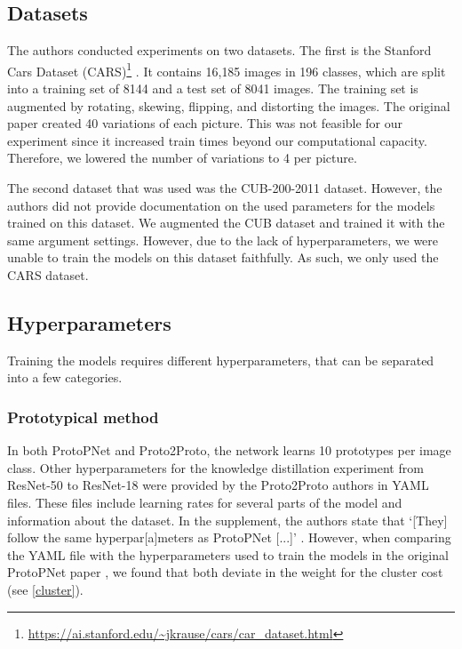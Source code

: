\subsection{Datasets}
The authors conducted experiments on two datasets. The first is the Stanford Cars Dataset (CARS)\footnote{\url{https://ai.stanford.edu/~jkrause/cars/car_dataset.html}} \cite{krause20133d}. It contains 16,185 images in 196 classes, which are split into a training set of 8144 and a test set of 8041 images. The training set is augmented by rotating, skewing, flipping, and distorting the images. The original paper created 40 variations of each picture. This was not feasible for our experiment since it increased train times beyond our computational capacity. Therefore, we lowered the number of variations to 4 per picture. \par 
The second dataset that was used was the CUB-200-2011 \cite{wah2011caltech} dataset. However, the authors did not provide documentation on the used parameters for the models trained on this dataset. We augmented the CUB dataset and trained it with the same argument settings. However, due to the lack of hyperparameters, we were unable to train the models on this dataset faithfully. As such, we only used the CARS dataset.


\subsection{Hyperparameters}
Training the models requires different hyperparameters, that can be separated into a few categories.

\subsubsection{Prototypical method}
In both ProtoPNet and Proto2Proto, the network learns 10 prototypes per image class. Other hyperparameters for the knowledge distillation experiment from ResNet-50 to ResNet-18 were provided by the Proto2Proto authors in YAML files. These files include learning rates for several parts of the model and information about the dataset. In the supplement, the authors state that `[They] follow the same hyperpar[a]meters as ProtoPNet [...]' \citep[Suppl. p.~1]{keswani2022proto2proto}. However, when comparing the YAML file with the hyperparameters used to train the models in the original ProtoPNet paper \citep[Suppl. p~24]{chen2019this}, we found that both deviate in the weight for the cluster cost (see \ref{cluster}).\par

